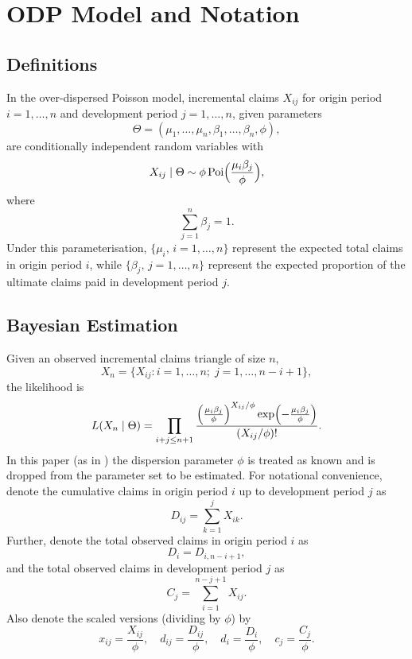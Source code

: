 \documentclass[aps,pre,draft]{revtex4-2}
\begin{document}
\section{ODP Model and Notation}

\subsection{Definitions}

In the over-dispersed Poisson model, incremental claims $X_{ij}$ for origin period $i=1,\dots,n$ and development period $j=1,\dots,n$, given parameters 
\[
\Theta = (\mu_1,\dots,\mu_n,\beta_1,\dots,\beta_n,\phi),
\]
are conditionally independent random variables with
\begin{equation}\label{eq:poi}
X_{ij}\mid\Theta \sim \phi\operatorname{Poi}\Bigl(\frac{\mu_i\beta_j}{\phi}\Bigr),
\end{equation}
where
\begin{equation}\label{eq:beta_sum}
\sum_{j=1}^{n}\beta_j = 1.
\end{equation}
Under this parameterisation, $\{\mu_i,\,i=1,\dots,n\}$ represent the expected total claims in origin period $i$, while $\{\beta_j,\,j=1,\dots,n\}$ represent the expected proportion of the 
ultimate claims paid in development period $j$. 

\subsection{Bayesian Estimation}

Given an observed incremental claims triangle of size $n$, 
\[
X_n = \{X_{ij} : i=1,\dots,n;\; j=1,\dots,n-i+1\},
\]
the likelihood is
\begin{equation}\label{eq:likelihood}
L(X_n\mid\Theta)=\prod_{i+j\le n+1} \frac{\Bigl(\frac{\mu_i\beta_j}{\phi}\Bigr)^{X_{ij}/\phi}\exp\Bigl(-\frac{\mu_i\beta_j}{\phi}\Bigr)}{(X_{ij}/\phi)!}.
\end{equation}
In this paper (as in \cite{england2012bayesian}) the dispersion parameter $\phi$ is treated as known and is dropped from the parameter set to be estimated. For notational convenience, denote the cumulative claims in origin period $i$ up to development period $j$ as
\[
D_{ij}=\sum_{k=1}^{j}X_{ik}.
\]
Further, denote the total observed claims in origin period $i$ as 
\[
D_i=D_{i,n-i+1},
\]
and the total observed claims in development period $j$ as
\[
C_j=\sum_{i=1}^{n-j+1}X_{ij}.
\]
Also denote the scaled versions (dividing by $\phi$) by
\[
x_{ij}=\frac{X_{ij}}{\phi},\quad d_{ij}=\frac{D_{ij}}{\phi},\quad d_i=\frac{D_i}{\phi},\quad c_j=\frac{C_j}{\phi}.
\]
\end{document}
